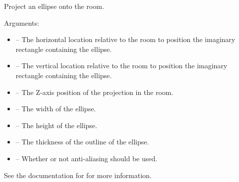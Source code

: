 \documentclass[letterpaper,10pt,english]{sphinxmanual}
\begin{document}
\begin{fulllineitems}
\label{dsp:sge.dsp.Room.project_ellipse}
Project an ellipse onto the room.

Arguments:
\begin{itemize}
\item {} 
 -- The horizontal location relative to the room to
position the imaginary rectangle containing the ellipse.

\item {} 
 -- The vertical location relative to the room to
position the imaginary rectangle containing the ellipse.

\item {} 
 -- The Z-axis position of the projection in the room.

\item {} 
 -- The width of the ellipse.

\item {} 
 -- The height of the ellipse.

\item {} 
 -- The thickness of the outline of the
ellipse.

\item {} 
 -- Whether or not anti-aliasing should be used.

\end{itemize}

See the documentation for {\hyperref[gfx:sge.gfx.Sprite.draw_ellipse]{\emph{}}}
for more information.

\end{fulllineitems}

\end{document}
